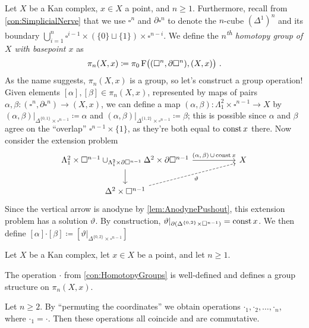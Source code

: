 \begin{con}\label{con:HomotopyGroups}
	Let $X$ be a Kan complex, $x\in X$ a point, and $n\geqslant 1$. Furthermore, recall from \cref{con:SimplicialNerve} that we use $\square^n$ and $\partial\square^n$ to denote the $n$-cube $(\Delta^1)^n$ and its boundary $\bigcup_{i=1}^n\square^{i-1}\times(\{0\}\sqcup\{1\})\times\square^{n-i}$. We define the \emph{$n$\textsuperscript{th} homotopy group of $X$ with basepoint $x$} as
	\begin{equation*}
		\pi_n(X,x)\coloneqq\pi_0\F\lef((\square^n,\partial\square^n),(X,x)\righ)\,.
	\end{equation*}
	As the name suggests, $\pi_n(X,x)$ is a group, so let's construct a group operation! Given elements $[\alpha],[\beta]\in\pi_n(X,x)$, represented by maps of pairs $\alpha,\beta\colon (\square^n,\partial\square^n)\rightarrow (X,x)$, we can define a map $(\alpha,\beta)\colon \Lambda_1^2\times\square^{n-1}\rightarrow X$ by $(\alpha,\beta)|_{\Delta^{\{0,1\}}\times\square^{n-1}}\coloneqq \alpha$ and $(\alpha,\beta)|_{\Delta^{\{1,2\}}\times\square^{n-1}}\coloneqq \beta$; this is possible since $\alpha$ and $\beta$ agree on the \enquote{overlap} $\square^{n-1}\times\{1\}$, as they're both equal to $\operatorname{const} x$ there. Now consider the extension problem
	\begin{equation*}
		\begin{tikzcd}[column sep=5.2em]
			\Lambda_1^2\times\square^{n-1}\cup_{\Lambda_1^2\times\partial\square^{n-1}}\Delta^2\times\partial\square^{n-1}\dar\rar["{(\alpha,\,\beta)\,\cup\, \const x}"] & X\\
			\Delta^2\times\square^{n-1}\urar[dashed,"\vartheta"',end anchor=202]
		\end{tikzcd}
	\end{equation*}
	Since the vertical arrow is anodyne by \cref{lem:AnodynePushout}, this extension problem has a solution $\vartheta$. By construction, $\vartheta|_{\partial(\Delta^{\{0,2\}}\times\square^{n-1})}=\operatorname{const} x$. We then define $[\alpha]\boldsymbol{\cdot}[\beta]\coloneqq [\vartheta|_{\Delta^{\{0,2\}}\times\square^{n-1}}]$
\end{con}
\begin{lem}\label{lem:HomotopyGroups}
	Let $X$ be a Kan complex, let $x\in X$ be a point, and let $n\geqslant 1$.
	\begin{alphanumerate}
		\item \!The operation $\cdot$ from \cref{con:HomotopyGroups} is well-defined  and defines a group structure on $\pi_n(X,x)$.\label{enum:HomotopyGroupsWellDefined}
		\item Let $n\geqslant 2$. By \enquote{permuting the coordinates} we obtain operations $\boldsymbol{\cdot}_1,\boldsymbol{\cdot}_2,\dotsc,\boldsymbol{\cdot}_n$, where $\boldsymbol{\cdot}_1=\boldsymbol{\cdot}$. Then these operations all coincide and are commutative.\label{enum:EckmannHilton}
	\end{alphanumerate}
\end{lem}
